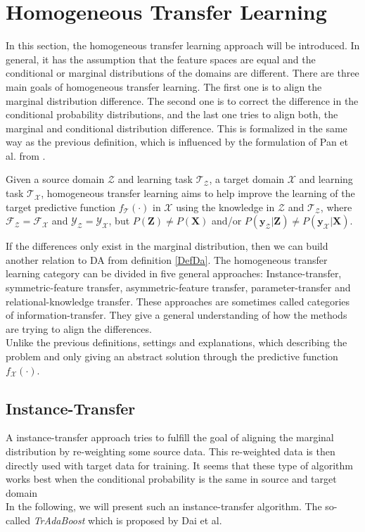 \section{Homogeneous Transfer Learning}\label{TlSecHomo}
In this section, the homogeneous transfer learning approach will be introduced.
In general, it has the assumption that the feature spaces are equal and the conditional or marginal distributions of the domains are different.
There are three main goals of homogeneous transfer learning.
The first one is to align the marginal distribution difference.
The second one is to correct the difference in the conditional probability distributions, and the last one tries to align both, the marginal and conditional distribution difference.\cite[p. 6]{Weiss.2016}
This is formalized in the same way as the previous definition, which is influenced by the formulation of Pan et al. from \cite{Pan.2010}.
\begin{mDef}\label{DefHomogeneous}
	Given a source domain $\mathcal{Z}$ and learning task $\mathcal{T_Z}$, a target domain $\mathcal{X}$ and learning task $\mathcal{T_X}$, homogeneous transfer learning aims to help improve the learning of the target predictive function $f_\mathcal{T}(\cdot)$ in $\mathcal{X}$ using the knowledge in $\mathcal{Z}$ and $\mathcal{T_Z}$, where $\mathcal{F_Z} = \mathcal{F_X}$ and $\mathcal{Y_Z} =\mathcal{Y_X} $, but $P(\mathbf{Z}) \neq P(\mathbf{X})$ and/or $P(\mathbf{y_\mathcal{Z}}\vert \mathbf{Z}) \neq P(\mathbf{y_\mathcal{X}}\vert \mathbf{X})$.\cite[p. 4]{Weiss.2016}
\end{mDef}
If the differences only exist in the marginal distribution, then we can build another relation to \acl{DA} from definition \ref{DefDa}.
The homogeneous transfer learning category can be divided in five general approaches:
Instance-transfer, symmetric-feature transfer, asymmetric-feature transfer, parameter-transfer and relational-knowledge transfer.
These approaches are sometimes called categories of information-transfer.
They give a general understanding of how the methods are trying to align the differences.\cite[p. 6-7]{Weiss.2016}\\
Unlike the previous definitions, settings and explanations, which describing the problem and only giving an abstract solution through the predictive function $f_\mathcal{X}(\cdot)$.
\subsection{Instance-Transfer}\label{TlSubSecInstance}
A instance-transfer approach tries to fulfill the goal of aligning the marginal distribution by re-weighting some source data.
This re-weighted data is then directly used with target data for training.
It seems that these type of algorithm works best when the conditional probability is the same in source and target domain \cite[p. 6]{Weiss.2016}\\
In the following, we will present such an instance-transfer algorithm.
The so-called \textit{TrAdaBoost} which is proposed by Dai et al.\cite{Pan.2010}\\
